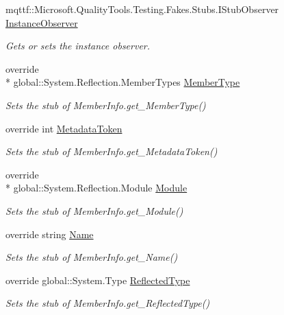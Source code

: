 \begin{DoxyCompactItemize}
mqttf\-::\-Microsoft.\-Quality\-Tools.\-Testing.\-Fakes.\-Stubs.\-I\-Stub\-Observer \hyperlink{class_system_1_1_reflection_1_1_fakes_1_1_stub_member_info_a57457cc40a1f357c9baeae0d6247077e}{Instance\-Observer}
\begin{DoxyCompactList}\small\item\em Gets or sets the instance observer.\end{DoxyCompactList}\item 
override \\*
global\-::\-System.\-Reflection.\-Member\-Types \hyperlink{class_system_1_1_reflection_1_1_fakes_1_1_stub_member_info_a1c6f6723a1f0c5a33b81aa4272fe3a68}{Member\-Type}
\begin{DoxyCompactList}\small\item\em Sets the stub of Member\-Info.\-get\-\_\-\-Member\-Type()\end{DoxyCompactList}\item 
override int \hyperlink{class_system_1_1_reflection_1_1_fakes_1_1_stub_member_info_affbc08eed3f5250b1e98d3d738a71dee}{Metadata\-Token}
\begin{DoxyCompactList}\small\item\em Sets the stub of Member\-Info.\-get\-\_\-\-Metadata\-Token()\end{DoxyCompactList}\item 
override \\*
global\-::\-System.\-Reflection.\-Module \hyperlink{class_system_1_1_reflection_1_1_fakes_1_1_stub_member_info_aedf2c8a19d43410109af0ae28e825d16}{Module}
\begin{DoxyCompactList}\small\item\em Sets the stub of Member\-Info.\-get\-\_\-\-Module()\end{DoxyCompactList}\item 
override string \hyperlink{class_system_1_1_reflection_1_1_fakes_1_1_stub_member_info_a1f35750b2acc1331812146af0b8b15fc}{Name}
\begin{DoxyCompactList}\small\item\em Sets the stub of Member\-Info.\-get\-\_\-\-Name()\end{DoxyCompactList}\item 
override global\-::\-System.\-Type \hyperlink{class_system_1_1_reflection_1_1_fakes_1_1_stub_member_info_a8da5f1d504a17897f4c4ade195eccea9}{Reflected\-Type}
\begin{DoxyCompactList}\small\item\em Sets the stub of Member\-Info.\-get\-\_\-\-Reflected\-Type()\end{DoxyCompactList}\end{DoxyCompactItemize}


